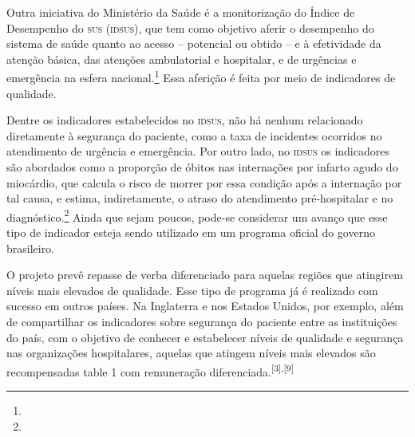 \documentclass{article}
\begin{document}
Outra iniciativa do Ministério da Saúde é a monitorização do Índice de
Desempenho do \textsc{sus}
(\textsc{idsus}), que tem como objetivo aferir o desempenho do sistema de saúde quanto ao
acesso –
potencial ou obtido – e à efetividade da atenção básica, das atenções
ambulatorial e
hospitalar, e de urgências e emergência na esfera nacional.\footnote{}
Essa aferição é feita por meio de indicadores de qualidade.

Dentre os indicadores estabelecidos no \textsc{idsus}, não há nenhum relacionado
diretamente à
segurança do paciente, como a taxa de incidentes ocorridos no atendimento de
urgência e
emergência. Por outro lado, no \textsc{idsus} os indicadores são abordados como a
proporção de óbitos
nas internações por infarto agudo do miocárdio, que calcula o risco de morrer
por essa
condição após a internação por tal causa, e estima, indiretamente, o atraso do
atendimento
pré-hospitalar e no diagnóstico.\footnote{}
Ainda que sejam poucos, pode-se considerar um avanço que esse tipo de indicador
esteja sendo utilizado em um programa oficial do governo brasileiro.

O projeto prevê repasse de verba diferenciado para aquelas regiões que atingirem
níveis
mais elevados de qualidade. Esse tipo de programa já é realizado com sucesso em
outros
países. Na Inglaterra e nos Estados Unidos, por exemplo, além de compartilhar os
indicadores
sobre segurança do paciente entre as instituições do país, com o objetivo de
conhecer e
estabelecer níveis de qualidade e segurança nas organizações hospitalares,
aquelas que
atingem níveis mais elevados são recompensadas table 1 com remuneração
diferenciada.\textsuperscript{[}\textsuperscript{3}\textsuperscript{]}\textsuperscript{,}\textsuperscript{[}\textsuperscript{9}\textsuperscript{]}

\begingroup
{}
\end{document}
